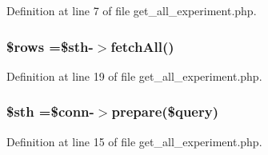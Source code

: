 Definition at line 7 of file get\-\_\-all\-\_\-experiment.\-php.

\hypertarget{freshweight_2get__all__experiment_8php_ace2ec39e7df3899fa8df9640ec274b03}{
\subsubsection[{\$rows}]{\setlength{\rightskip}{0pt plus 5cm}\$rows =\$sth-\/$>$fetch\-All()}}\label{freshweight_2get__all__experiment_8php_ace2ec39e7df3899fa8df9640ec274b03}


Definition at line 19 of file get\-\_\-all\-\_\-experiment.\-php.

\hypertarget{freshweight_2get__all__experiment_8php_afa9126f9664959c02795be300a135f93}{
\subsubsection[{\$sth}]{\setlength{\rightskip}{0pt plus 5cm}\$sth =\$conn-\/$>$prepare(\$query)}}\label{freshweight_2get__all__experiment_8php_afa9126f9664959c02795be300a135f93}


Definition at line 15 of file get\-\_\-all\-\_\-experiment.\-php.

